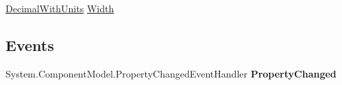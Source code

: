 \begin{DoxyCompactItemize}
\begin{DoxyCompactList}\small\item\em \end{DoxyCompactList}\item 
\hypertarget{class_price___comparison_1_1amazon_1_1ecs_1_1_item_attributes_item_dimensions_a5bc87c8fd580d9a8bb91f34af350473f}{\hyperlink{class_price___comparison_1_1amazon_1_1ecs_1_1_decimal_with_units}{Decimal\-With\-Units} \hyperlink{class_price___comparison_1_1amazon_1_1ecs_1_1_item_attributes_item_dimensions_a5bc87c8fd580d9a8bb91f34af350473f}{Width}}\label{class_price___comparison_1_1amazon_1_1ecs_1_1_item_attributes_item_dimensions_a5bc87c8fd580d9a8bb91f34af350473f}

\begin{DoxyCompactList}\small\item\em \end{DoxyCompactList}\end{DoxyCompactItemize}
\subsection*{Events}
\begin{DoxyCompactItemize}
\item 
\hypertarget{class_price___comparison_1_1amazon_1_1ecs_1_1_item_attributes_item_dimensions_a40c39b71f89184ab9f20dfa0a0518479}{System.\-Component\-Model.\-Property\-Changed\-Event\-Handler {\bfseries Property\-Changed}}\label{class_price___comparison_1_1amazon_1_1ecs_1_1_item_attributes_item_dimensions_a40c39b71f89184ab9f20dfa0a0518479}

\end{DoxyCompactItemize}

